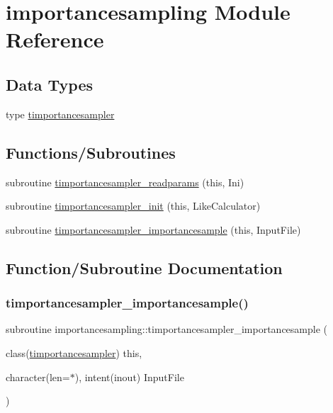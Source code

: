 \hypertarget{namespaceimportancesampling}{}\section{importancesampling Module Reference}
\label{namespaceimportancesampling}
\subsection*{Data Types}
\begin{DoxyCompactItemize}
\item 
type \mbox{\hyperlink{structimportancesampling_1_1timportancesampler}{timportancesampler}}
\end{DoxyCompactItemize}
\subsection*{Functions/\+Subroutines}
\begin{DoxyCompactItemize}
\item 
subroutine \mbox{\hyperlink{namespaceimportancesampling_a39599f2e0377c272c415338ef81396df}{timportancesampler\+\_\+readparams}} (this, Ini)
\item 
subroutine \mbox{\hyperlink{namespaceimportancesampling_a3004e02389d8cf9b604c564fbfef6d9f}{timportancesampler\+\_\+init}} (this, Like\+Calculator)
\item 
subroutine \mbox{\hyperlink{namespaceimportancesampling_a3f315e6a06f67ec1e9e1c310e410a10a}{timportancesampler\+\_\+importancesample}} (this, Input\+File)
\end{DoxyCompactItemize}


\subsection{Function/\+Subroutine Documentation}
\mbox{\label{namespaceimportancesampling_a3f315e6a06f67ec1e9e1c310e410a10a}} 
\subsubsection{\texorpdfstring{timportancesampler\+\_\+importancesample()}{timportancesampler\_importancesample()}}
{\footnotesize\ttfamily subroutine importancesampling\+::timportancesampler\+\_\+importancesample (\begin{DoxyParamCaption}\item[{class(\mbox{\hyperlink{structimportancesampling_1_1timportancesampler}{timportancesampler}})}]{this,  }\item[{character(len=$\ast$), intent(inout)}]{Input\+File }\end{DoxyParamCaption})\hspace{0.3cm}{\ttfamily [private]}}



